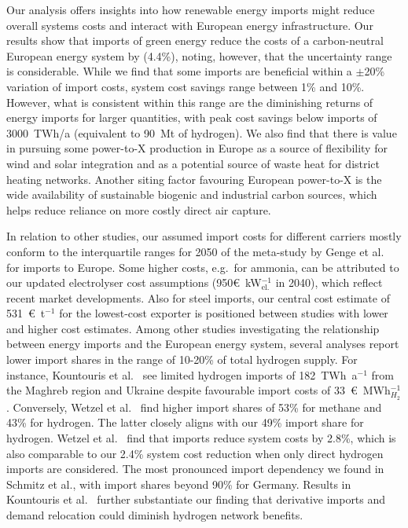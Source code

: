 Our analysis offers insights into how renewable energy imports might reduce
overall systems costs and interact with European energy infrastructure. Our
results show that imports of green energy reduce the costs of a carbon-neutral
European energy system by  (4.4\%), noting, however, that the
uncertainty range is considerable. While we find that some imports are
beneficial within a $\pm$20\% variation of import costs, system cost savings
range between 1\% and 10\%. However, what is consistent within this range are
the diminishing returns of energy imports for larger quantities, with peak cost
savings below imports of 3000~TWh/a (equivalent to 90~Mt of hydrogen). We also find
that there is value in pursuing some \mbox{power-to-X} production in Europe as a
source of flexibility for wind and solar integration and as a potential source
of waste heat for district heating networks. Another siting factor favouring
European \mbox{power-to-X} is the wide availability of sustainable biogenic and
industrial carbon sources, which helps reduce reliance on more costly direct air
capture.


In relation to other studies, our assumed import costs for different carriers
mostly conform to the interquartile ranges for 2050 of the meta-study by Genge
et al.~\cite{gengeSupplyCostsGreen2023} for imports to Europe. Some higher
costs, e.g.~for ammonia, can be attributed to our updated electrolyser cost
assumptions (950\euro{}~kW$_\text{el.}^{-1}$ in 2040), which reflect recent
market developments.\cite{ieaGlobalHydrogenReview2024} Also for steel imports,
our central cost estimate of 531~\euro{}~t$^{-1}$ for the lowest-cost exporter
is positioned between studies with lower\cite{lopezDefossilisedSteel2023} and
higher\cite{verpoortImpactGlobalHeterogeneity2024} cost estimates. Among other
studies investigating the relationship between energy imports and the European
energy system, several analyses report lower import shares in the range of
10-20\% of total hydrogen
supply.\cite{seckHydrogenDecarbonization2022,frischmuthHydrogenSourcingStrategies2022,kountourisUnifiedEuropeanHydrogen2024}
For instance, Kountouris et al.~\cite{kountourisUnifiedEuropeanHydrogen2024} see
limited hydrogen imports of 182~TWh~a$^{-1}$ from the Maghreb region and Ukraine
despite favourable import costs of 33~\euro{}~MWh$_{H_2}^{-1}$. Conversely,
Wetzel et al.~\cite{wetzelGreenEnergy2023a} find higher import shares of 53\%
for methane and 43\% for hydrogen. The latter closely aligns with our 49\%
import share for hydrogen. Wetzel et al.~\cite{wetzelGreenEnergy2023a} find that
imports reduce system costs by 2.8\%, which is also comparable to our 2.4\%
system cost reduction when only direct hydrogen imports are considered. The most
pronounced import dependency we found in Schmitz et
al.\cite{schmitzImplicationsHydrogenImport2024a}, with import shares beyond 90\%
for Germany. Results in Kountouris et
al.~\cite{kountourisUnifiedEuropeanHydrogen2024} further substantiate our
finding that derivative imports and demand relocation could diminish hydrogen
network benefits.

